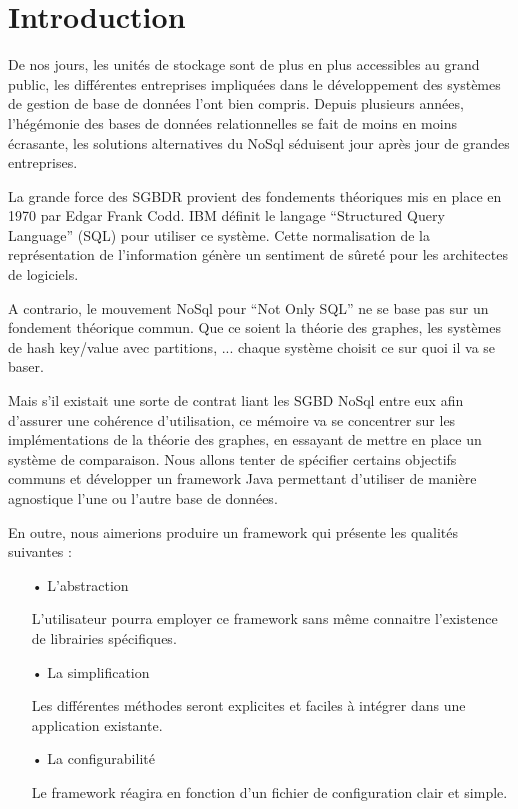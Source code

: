 \documentclass[a4paper,fleqn,12pt]{report}
\begin{document}
\chapter*{Introduction}

De nos jours, les unités de stockage sont de plus en plus accessibles au grand public, les différentes entreprises impliquées dans le développement des systèmes de gestion de base de données l'ont bien compris. Depuis plusieurs années, l'hégémonie des bases de données relationnelles se fait de moins en moins écrasante, les solutions alternatives du NoSql séduisent jour après jour de grandes entreprises. 

La grande force des SGBDR provient des fondements théoriques mis en place en 1970 par Edgar Frank Codd. IBM définit le langage \enquote{Structured Query Language} (SQL) pour utiliser ce système. Cette normalisation de la représentation de l'information génère un sentiment de sûreté pour les architectes de logiciels.

A contrario, le mouvement NoSql pour \enquote{Not Only SQL} ne se base pas sur un fondement théorique commun. Que ce soient la théorie des graphes, les systèmes de hash key/value avec partitions, ... chaque système choisit ce sur quoi il va se baser. 

Mais s'il existait une sorte de contrat liant les SGBD NoSql entre eux afin d'assurer une cohérence d'utilisation, ce mémoire va se concentrer sur les implémentations de la théorie des graphes, en essayant de mettre en place un système de comparaison. Nous allons tenter de spécifier certains objectifs communs et développer un framework Java permettant d'utiliser de manière agnostique l'une ou l'autre base de données.

En outre, nous aimerions produire un framework qui présente les qualités suivantes :
\begin{itemize}
\item[•] L'abstraction

\quad L'utilisateur pourra employer ce framework sans même connaitre l'existence de librairies spécifiques.
\item[•] La simplification

\quad Les différentes méthodes seront explicites et faciles à intégrer dans une application existante.
\item[•] La configurabilité 

\quad Le framework réagira en fonction d'un fichier de configuration clair et simple.
\end{itemize}
 
\end{document}
